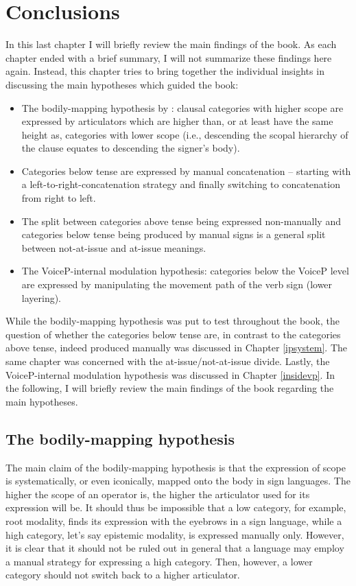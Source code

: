 \chapter{Conclusions}\label{chapterconclusions}
In this last chapter I will briefly review the main findings of the book. As each chapter ended with a brief summary, I will not summarize these findings here again. Instead, this chapter tries to bring together the individual insights in discussing the main hypotheses which guided the book:


\begin{itemize}[itemsep=0pt]
	\item The bodily-mapping hypothesis by \citet{bross2017scope}: clausal categories with higher scope are expressed by articulators which are higher than, or at least have the same height as, categories with lower scope (i.e., descending the scopal hierarchy of the clause equates to descending the signer's body).
	\item Categories below tense are expressed by manual concatenation -- starting with a left-to-right-concatenation strategy and finally switching to concatenation from right to left.
	\item The split between categories above tense being expressed non-manually and categories below tense being produced by manual signs is a general split between not-at-issue and at-issue meanings.
	\item The VoiceP-internal modulation hypothesis: categories below the VoiceP level are expressed by manipulating the movement path of the verb sign (lower layering).
\end{itemize}

\noindent While the bodily-mapping hypothesis was put to test throughout the book, the question of whether the categories below tense are, in contrast to the categories above tense, indeed produced manually was discussed in Chapter \ref{ipsystem}. The same chapter was concerned with the at-issue/not-at-issue divide. Lastly, the VoiceP-internal modulation hypothesis was discussed in Chapter \ref{insidevp}. In the following, I will briefly review the main findings of the book regarding the main hypotheses.

\section{The bodily-mapping hypothesis}
The main claim of the bodily-mapping hypothesis is that the expression of scope is systematically, or even iconically, mapped onto the body in sign languages. The higher the scope of an operator is, the higher the articulator used for its expression will be. It should thus be impossible that a low category, for example, root modality, finds its expression with the eyebrows in a sign language, while a high category, let's say epistemic modality, is expressed manually only. However, it is clear that it should not be ruled out in general that a language may employ a manual strategy for expressing a high category. Then, however, a lower category should not switch back to a higher articulator. 

